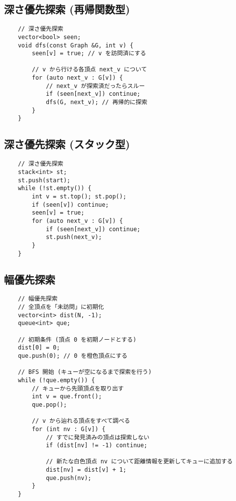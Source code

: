 \documentclass[a4paper, landscape, 9pt]{jarticle} %
\begin{document}
\begin{multicols*}{3}
    \subsection{深さ優先探索 (再帰関数型)}
    \begin{lstlisting}
    // 深さ優先探索
    vector<bool> seen;
    void dfs(const Graph &G, int v) {
        seen[v] = true; // v を訪問済にする
    
        // v から行ける各頂点 next_v について
        for (auto next_v : G[v]) { 
            // next_v が探索済だったらスルー
            if (seen[next_v]) continue;
            dfs(G, next_v); // 再帰的に探索
        }
    }
    \end{lstlisting}

    \subsection{深さ優先探索 (スタック型)}
    \begin{lstlisting}
    // 深さ優先探索
    stack<int> st;
    st.push(start);
    while (!st.empty()) {
        int v = st.top(); st.pop();
        if (seen[v]) continue;
        seen[v] = true;
        for (auto next_v : G[v]) {
            if (seen[next_v]) continue;
            st.push(next_v);
        }
    }
    \end{lstlisting}

    \subsection{幅優先探索}
    \begin{lstlisting}
    // 幅優先探索
    // 全頂点を「未訪問」に初期化
    vector<int> dist(N, -1); 
    queue<int> que;

    // 初期条件 (頂点 0 を初期ノードとする)
    dist[0] = 0;
    que.push(0); // 0 を橙色頂点にする

    // BFS 開始 (キューが空になるまで探索を行う)
    while (!que.empty()) {
        // キューから先頭頂点を取り出す
        int v = que.front(); 
        que.pop();

        // v から辿れる頂点をすべて調べる
        for (int nv : G[v]) {
            // すでに発見済みの頂点は探索しない
            if (dist[nv] != -1) continue; 

            // 新たな白色頂点 nv について距離情報を更新してキューに追加する
            dist[nv] = dist[v] + 1;
            que.push(nv);
        }
    }
    \end{lstlisting}


\end{multicols*}
\end{document}
